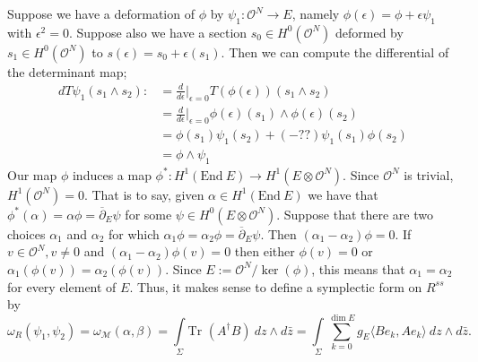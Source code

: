 \documentclass[]{article}
\newcommand{\OO}{\mathcal{O}}
\newcommand{\MM}{\mathcal{M}}
\newcommand{\End}{\text{End}~}
\newcommand{\dbar}{\overline{\partial}}
\newcommand{\Tr}{\text{Tr }}
\begin{document}
	
	Suppose we have a deformation of $\phi$ by $\psi_1:\OO^N \to E$, namely $\phi(\epsilon) = \phi + \epsilon\psi_1$ with $\epsilon^2=0$. Suppose also we have a section $s_0 \in H^0(\OO^N)$ deformed by $s_1 \in H^0(\OO^N)$ to $s(\epsilon) = s_0 + \epsilon(s_1)$. Then we can compute the differential of the determinant map;
	\begin{align*}
		dT\psi_1(s_1\wedge s_2) :&= \frac{d}{d\epsilon}|_{\epsilon=0} T(\phi(\epsilon))(s_1\wedge s_2)\\
		&=\frac{d}{d\epsilon}|_{\epsilon=0}\phi(\epsilon)(s_1)\wedge \phi(\epsilon)(s_2)\\
		&= \phi(s_1) \psi_1(s_2) +(-??) \psi_1(s_1)\phi(s_2)\\
		&= \phi\wedge \psi_1
	\end{align*}
	Our map $\phi$ induces a map $\phi^\ast :H^1(\End E) \to H^1(E\otimes \OO^N)$. Since $\OO^N$ is trivial, $H^1(\OO^N) =0$. That is to say, given $\alpha \in H^1(\End E)$ we have that $\phi^\ast(\alpha) = \alpha \phi = \dbar_E \psi$ for some $\psi \in H^0(E\otimes \OO^N)$.  Suppose that there are two choices $\alpha_1$ and $\alpha_2$ for which $\alpha_1 \phi = \alpha_2 \phi = \dbar_E \psi$. Then $(\alpha_1 - \alpha_2)\phi = 0$. If $v\in \OO^N, v\neq 0$ and $(\alpha_1 - \alpha_2)\phi(v) = 0$ then either $\phi(v)=0$ or $\alpha_1(\phi(v)) = \alpha_2(\phi(v))$. Since $E := \OO^N / \ker(\phi)$, this means that $\alpha_1 = \alpha_2$ for every element of $E$. Thus, it makes sense to define a symplectic form on $R^{ss}$ by
	\begin{equation}
		\omega_R(\psi_1,\psi_2) = \omega_\MM(\alpha, \beta) = \int\limits_{\Sigma} \Tr(A^\dagger B) ~dz \wedge d\bar{z} = \int\limits_{\Sigma} \sum_{k=0}^{\dim E} g_E\langle Be_k, Ae_k\rangle ~dz\wedge d\bar{z}.
	\end{equation}
\end{document}
